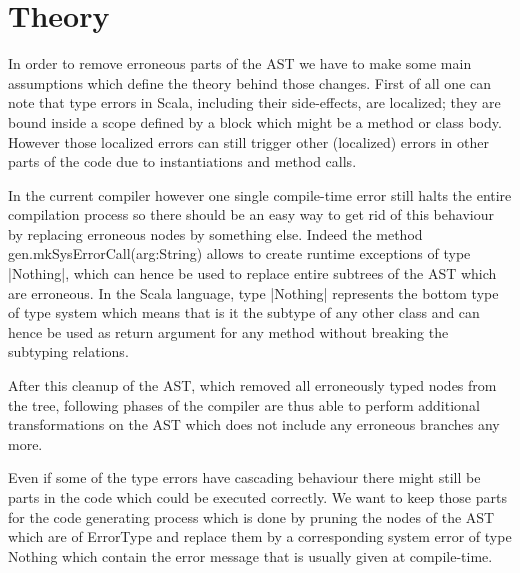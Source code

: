 \section{Theory}


In order to remove erroneous parts of the AST we have to make some main assumptions which define the theory behind those changes.
First of all one can note that type errors in Scala, including their side-effects, are localized; they are bound inside a scope defined by a block which might be a method or class body. However those localized errors can still trigger other (localized) errors in other parts of the code due to instantiations and method calls.

In the current compiler however one single compile-time error still halts the entire compilation process so there should be an easy way to get rid of this behaviour by replacing erroneous nodes by something else. Indeed the method gen.mkSysErrorCall(arg:String) allows to create runtime exceptions of type |Nothing|, which can hence be used to replace entire subtrees of the AST which are erroneous. In the Scala language, type |Nothing| represents the bottom type of type system which means that is it the subtype of any other class and can hence be used as return argument for any method without breaking the subtyping relations.

After this cleanup of the AST, which removed all erroneously typed nodes from the tree, following phases of the compiler are thus able to perform additional transformations on the AST which does not include any erroneous branches any more.

Even if some of the type errors have cascading behaviour there might still be parts in the code which could be executed correctly. We want to keep those parts for the code generating process which is done by pruning the nodes of the AST which are of ErrorType and replace them by a corresponding system error of type Nothing which contain the error message that is usually given at compile-time.

